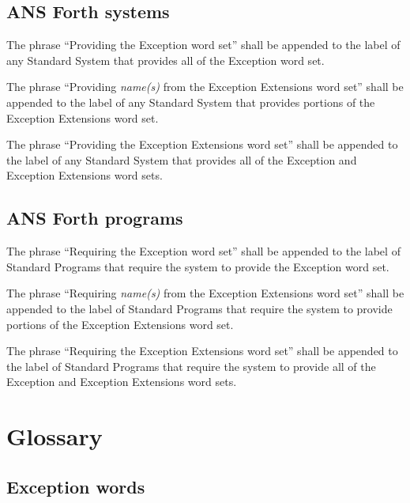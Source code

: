 \subsection{ANS Forth systems} %

The phrase ``Providing the Exception word set'' shall be appended to
the label of any Standard System that provides all of the Exception
word set.

The phrase ``Providing \emph{name(s)} from the Exception Extensions
word set'' shall be appended to the label of any Standard System
that provides portions of the Exception Extensions word set.

The phrase ``Providing the Exception Extensions word set'' shall be
appended to the label of any Standard System that provides all of
the Exception and Exception Extensions word sets.

\subsection{ANS Forth programs} %

The phrase ``Requiring the Exception word set'' shall be appended
to the label of Standard Programs that require the system to provide
the Exception word set.

The phrase ``Requiring \emph{name(s)} from the Exception Extensions
word set'' shall be appended to the label of Standard Programs that
require the system to provide portions of the Exception Extensions
word set.

The phrase ``Requiring the Exception Extensions word set'' shall be
appended to the label of Standard Programs that require the system
to provide all of the Exception and Exception Extensions word sets.

\section{Glossary} %

\subsection{Exception words} %

